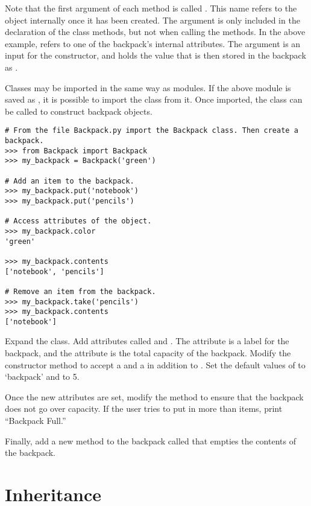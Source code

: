 Note that the first argument of each method is called .
This name refers to the object internally once it has been created.
The  argument is only included in the declaration of the class methods, but not when calling the methods.
In the above example,  refers to one of the backpack's internal attributes.
The argument  is an input for the constructor, and holds the value that is then stored in the backpack as .

Classes may be imported in the same way as modules.
If the above module is saved as , it is possible to import the  class from it.
Once imported, the  class can be called to construct backpack objects.

\begin{lstlisting}
# From the file Backpack.py import the Backpack class. Then create a backpack.
>>> from Backpack import Backpack
>>> my_backpack = Backpack('green')

# Add an item to the backpack.
>>> my_backpack.put('notebook')
>>> my_backpack.put('pencils')

# Access attributes of the object.
>>> my_backpack.color
'green'

>>> my_backpack.contents
['notebook', 'pencils']

# Remove an item from the backpack.
>>> my_backpack.take('pencils')
>>> my_backpack.contents
['notebook']
\end{lstlisting}

\begin{problem}
Expand the  class.
Add attributes called  and .
The  attribute is a label for the backpack, and the  attribute is the total capacity of the backpack.
Modify the constructor method to accept a  and a  in addition to .
Set the default values of  to `backpack' and  to 5.

Once the new attributes are set, modify the  method to ensure that the backpack does not go over capacity.
If the user tries to put in more than  items, print ``Backpack Full.''

Finally, add a new method to the backpack called  that empties the contents of the backpack.
\end{problem}

\section*{Inheritance}

